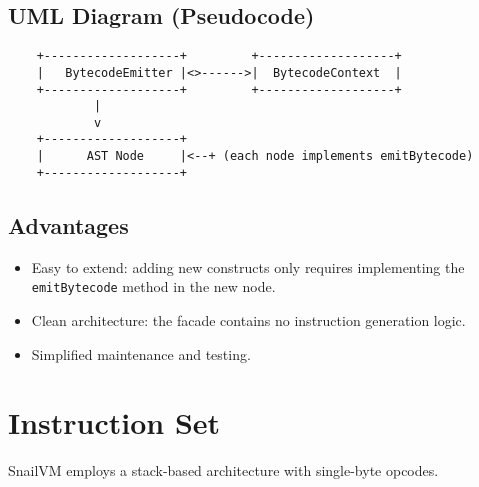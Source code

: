 \documentclass[a4paper,12pt]{article}
\begin{document}
    \subsection{UML Diagram (Pseudocode)}
    \begin{verbatim}
    +-------------------+         +-------------------+
    |   BytecodeEmitter |<>------>|  BytecodeContext  |
    +-------------------+         +-------------------+
            |
            v
    +-------------------+
    |      AST Node     |<--+ (each node implements emitBytecode)
    +-------------------+
    \end{verbatim}

    \subsection{Advantages}
    \begin{itemize}
      \item Easy to extend: adding new constructs only requires implementing the \texttt{emitBytecode} method in the new node.
      \item Clean architecture: the facade contains no instruction generation logic.
      \item Simplified maintenance and testing.
    \end{itemize}

    \section{Instruction Set}
    SnailVM employs a stack-based architecture with single-byte opcodes.
\end{document}
